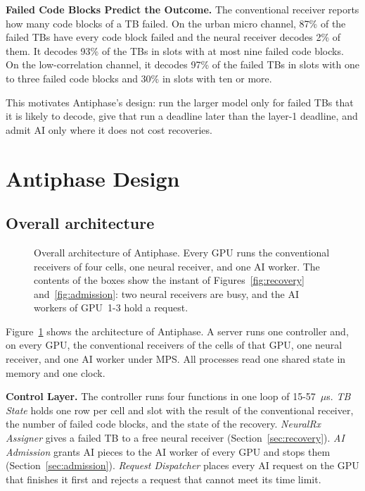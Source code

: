 \documentclass[acmsmall,screen,review,anonymous]{acmart}
\newcommand{\sys}{Antiphase\xspace}
\begin{document}
\noindent\textbf{Failed Code Blocks Predict the Outcome.} The conventional receiver reports how many code
blocks of a TB failed. On the urban micro channel, 87\% of the failed TBs have every code block failed and
the neural receiver decodes 2\% of them. It decodes 93\% of the TBs in slots with at most nine failed code
blocks. On the low-correlation channel, it decodes 97\% of the failed TBs in slots with one to three failed
code blocks and 30\% in slots with ten or more.

This motivates \sys's design: run the larger model only for failed TBs that it is likely to decode, give
that run a deadline later than the layer-1 deadline, and admit AI only where it does not cost recoveries.

\section{\sys Design}
\label{sec:path}

\subsection{Overall architecture}

\begin{figure}[t]
\centering
\resizebox{\linewidth}{!}{}
\caption{Overall architecture of \sys. Every GPU runs the conventional receivers of four cells, one neural
receiver, and one AI worker. The contents of the boxes show the instant of Figures~\ref{fig:recovery}
and~\ref{fig:admission}: two neural receivers are busy, and the AI workers of GPU~1-3 hold a request.}
\label{fig:architecture}
\end{figure}

Figure~\ref{fig:architecture} shows the architecture of \sys. A server runs one controller and, on every
GPU, the conventional receivers of the cells of that GPU, one neural receiver, and one AI worker under MPS.
All processes read one shared state in memory and one clock.

\noindent\textbf{Control Layer.} The controller runs four functions in one loop of 15-57~$\mu$s. \textit{TB
State} holds one row per cell and slot with the result of the conventional receiver, the number of failed
code blocks, and the state of the recovery. \textit{NeuralRx Assigner} gives a failed TB to a free neural
receiver (Section~\ref{sec:recovery}). \textit{AI Admission} grants AI pieces to the AI worker of every
GPU and stops them (Section~\ref{sec:admission}). \textit{Request Dispatcher} places every AI request on
the GPU that finishes it first and rejects a request that cannot meet its time limit.
\end{document}
